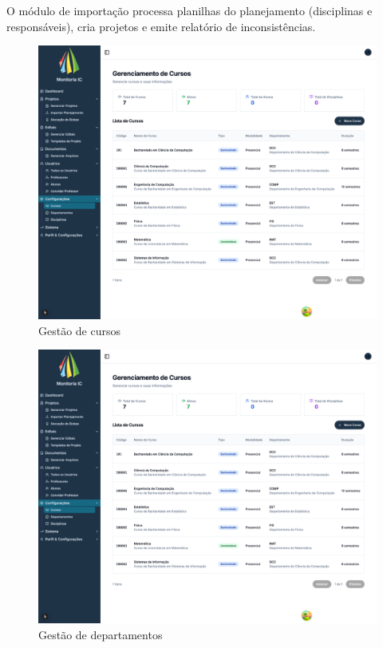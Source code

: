 \documentclass[portuguese]{sbc2025}%
\begin{document}
O módulo de importação processa planilhas do planejamento (disciplinas e responsáveis), cria projetos e emite relatório de inconsistências.

\begin{figure}[h!]
  \centering
  \includegraphics[width=\linewidth]{images/monitoria/admin-cursos.png}
  \caption{Gestão de cursos}
  \label{fig:admin-cursos}
\end{figure}

\begin{figure}[h!]
  \centering
  \includegraphics[width=\linewidth]{images/monitoria/admin-departamentos.png}
  \caption{Gestão de departamentos}
  \label{fig:admin-departamentos}
\end{figure}
\end{document}
